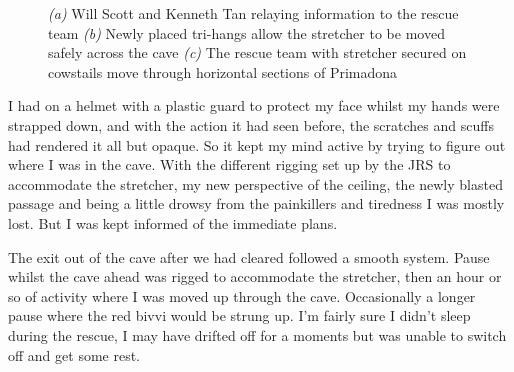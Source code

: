\begin{figure}[t!]
         \vspace{0.3cm}

        \begin{subfigure}[t]{\textwidth}
            \centering
            \caption{} \label{stretcher moved}
        \end{subfigure}

            \caption{
            \textit{(a)} Will Scott and Kenneth Tan relaying information to the rescue team
            \textit{(b)} Newly placed tri-hangs allow the stretcher to be moved safely across the cave
            \textit{(c)} The rescue team with stretcher secured on cowstails move through horizontal sections of Primadona }
    \end{figure}


    I had on a helmet with a plastic guard to protect my face whilst my hands were strapped down, and with the action it had seen before, the scratches and scuffs had rendered it all but opaque. So it kept my mind active by trying to figure out where I was in the cave. With the different rigging set up by the JRS to accommodate the stretcher, my new perspective of the ceiling, the newly blasted passage and being a little drowsy from the painkillers and tiredness I was mostly lost. But I was kept informed of the immediate plans.

    The exit out of the cave after we had cleared  followed a smooth system. Pause whilst the cave ahead was rigged to accommodate the stretcher, then an hour or so of activity where I was moved up through the cave. Occasionally a longer pause where the red bivvi would be strung up. I'm fairly sure I didn't sleep during the rescue, I may have drifted off for a moments but was unable to switch off and get some rest.

